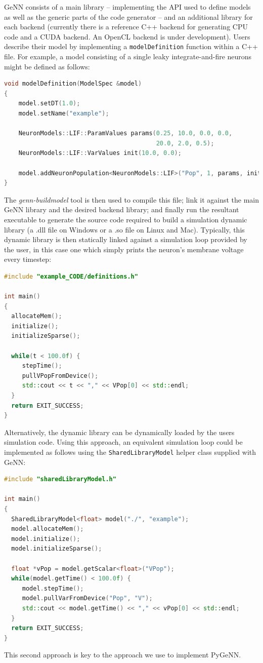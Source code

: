 \documentclass[utf8]{frontiersSCNS} %
\begin{document}
GeNN consists of a main library -- implementing the API used to define models as well as the generic parts of the code generator -- and an additional library for each backend (currently there is a reference C++ backend for generating CPU code and a CUDA backend. An OpenCL backend is under development).
Users describe their model by implementing a \lstinline{modelDefinition} function within a C++ file. For example, a model consisting of a single leaky integrate-and-fire neurons might be defined as follows:
%
\begin{lstlisting}[language=C++]
void modelDefinition(ModelSpec &model)
{
    model.setDT(1.0);
    model.setName("example");
    
    NeuronModels::LIF::ParamValues params(0.25, 10.0, 0.0, 0.0, 
                                          20.0, 2.0, 0.5);
    NeuronModels::LIF::VarValues init(10.0, 0.0);
    
    model.addNeuronPopulation<NeuronModels::LIF>("Pop", 1, params, init);
}
\end{lstlisting}
%
The \emph{genn-buildmodel} tool is then used to compile this file; link it against the main GeNN library and the desired backend library; and finally run the resultant executable to generate the source code required to build a simulation dynamic library (a .dll file on Windows or a .so file on Linux and Mac).
Typically, this dynamic library is then statically linked against a simulation loop provided by the user, in this case one which simply prints the neuron's membrane voltage every timestep:
%
\begin{lstlisting}[language=C++]
#include "example_CODE/definitions.h"

int main()
{
  allocateMem();
  initialize();
  initializeSparse();

  while(t < 100.0f) {
     stepTime();
     pullVPopFromDevice();
     std::cout << t << "," << VPop[0] << std::endl;
  }
  return EXIT_SUCCESS;
}
\end{lstlisting}
%
Alternatively, the dynamic library can be dynamically loaded by the users simulation code.
Using this approach, an equivalent simulation loop could be implemented as follows using the \lstinline{SharedLibraryModel} helper class supplied with GeNN:
%
\begin{lstlisting}[language=C++]
#include "sharedLibraryModel.h"

int main()
{
  SharedLibraryModel<float> model("./", "example");
  model.allocateMem();
  model.initialize();
  model.initializeSparse();

  float *vPop = model.getScalar<float>("VPop");
  while(model.getTime() < 100.0f) {
     model.stepTime();
     model.pullVarFromDevice("Pop", "V");
     std::cout << model.getTime() << "," << vPop[0] << std::endl;
  }
  return EXIT_SUCCESS;
}
\end{lstlisting}
%
This second approach is key to the approach we use to implement PyGeNN.
\end{document}
